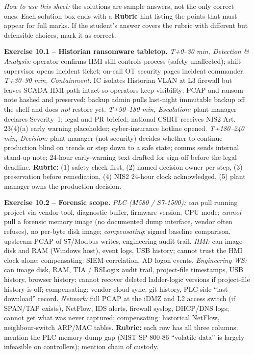 \documentclass[11pt,a4paper]{article}
\begin{document}
\sheetheader

\noindent
\textit{How to use this sheet:} the solutions are sample answers, not the only
correct ones. Each solution box ends with a \textbf{Rubric} hint listing the
points that must appear for full marks. If the student's answer covers the
rubric with different but defensible choices, mark it as correct.

\begin{solutionbox}
\textbf{Exercise 10.1 -- Historian ransomware tabletop.}
\textit{T+0--30 min, Detection \& Analysis:} operator confirms HMI still
controls process (safety unaffected); shift supervisor opens incident ticket;
on-call OT security pages incident commander. \textit{T+30--90 min,
Containment:} IC isolates Historian VLAN at L3 firewall but leaves SCADA-HMI
path intact so operators keep visibility; PCAP and ransom note hashed and
preserved; backup admin pulls last-night immutable backup off the shelf and
does \emph{not} restore yet. \textit{T+90--180 min, Escalation:} plant manager
declares Severity~1; legal and PR briefed; national CSIRT receives
NIS2 Art.\,23(4)(a) early warning placeholder; cyber-insurance hotline opened.
\textit{T+180--240 min, Decision:} plant manager (not security) decides whether
to continue production blind on trends or step down to a safe state; comms
sends internal stand-up note; 24-hour early-warning text drafted for sign-off
before the legal deadline. \textbf{Rubric:} (1) safety check first, (2) named
decision owner per step, (3) preservation before remediation, (4) NIS2 24-hour
clock acknowledged, (5) plant manager owns the production decision.
\end{solutionbox}

\begin{solutionbox}
\textbf{Exercise 10.2 -- Forensic scope.}
\textit{PLC (M580 / S7-1500):} \emph{can} pull running project via vendor tool,
diagnostic buffer, firmware version, CPU mode; \emph{cannot} pull a forensic
memory image (no documented dump interface, vendor often refuses), no per-byte
disk image; \emph{compensating}: signed baseline comparison, upstream PCAP of
S7/Modbus writes, engineering audit trail. \textit{HMI:} can image disk and
RAM (Windows host), event logs, USB history; cannot trust the HMI clock alone;
compensating: SIEM correlation, AD logon events. \textit{Engineering WS:} can
image disk, RAM, TIA / RSLogix audit trail, project-file timestamps, USB
history, browser history; cannot recover deleted ladder-logic versions if
project-file history is off; compensating: vendor cloud sync, git history,
PLC-side ``last download'' record. \textit{Network:} full PCAP at the iDMZ and
L2 access switch (if SPAN/TAP exists), NetFlow, IDS alerts, firewall syslog,
DHCP/DNS logs; cannot get what was never captured; compensating: historical
NetFlow, neighbour-switch ARP/MAC tables. \textbf{Rubric:} each row has all
three columns; mention the PLC memory-dump gap (NIST SP 800-86 ``volatile
data'' is largely infeasible on controllers); mention chain of custody.
\end{solutionbox}
\end{document}

